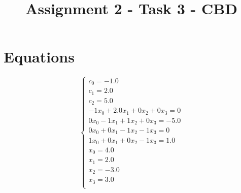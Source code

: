 \documentclass[a4paper,12pt]{article}
\begin{document}
\title{Assignment 2 - Task 3 - CBD}\date{}\maketitle
\section{Equations}
\[
\left\{
\begin{array}{c}
c_0 = -1.0 \\
c_1 = 2.0 \\
c_2 = 5.0 \\
-1x_0+2.0x_1+0x_2+0x_3 = 0 \\
0x_0-1x_1+1x_2+0x_3 = -5.0 \\
0x_0+0x_1-1x_2-1x_3 = 0 \\
1x_0+0x_1+0x_2-1x_3 = 1.0 \\x_0 = 4.0 \\
x_1 = 2.0 \\
x_2 = -3.0 \\
x_3 = 3.0 \\
\end{array}
\right.
\]
\end{document}
